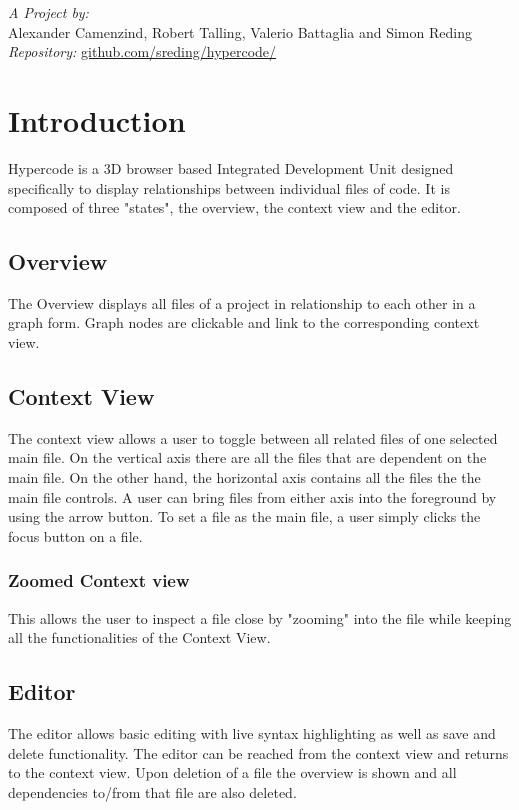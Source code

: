 \documentclass[a4paper]{article}
\author{Client: \realauthor \\
Universit\`a della Svizzera italiana - \coursename}
\title{\assingmentnr}
\begin{document}
\maketitle{\raggedleft}
\emph{A Project by:}\\
Alexander Camenzind, Robert Talling, Valerio Battaglia and Simon Reding\\

\emph{Repository:} \href{https://github.com/sreding/hypercode/}{github.com/sreding/hypercode/}

\section{Introduction}
Hypercode is a 3D browser based Integrated Development Unit designed specifically to display relationships between individual files of code. It is composed of three "states", the overview, the context view and the editor.
\subsection{Overview}
The Overview displays all files of a project in relationship to each other in a graph form. Graph nodes are clickable and link to the corresponding context view.
\subsection{Context View}
The context view allows a user to toggle between all related files of one selected main file. On the vertical axis there are all the files that are dependent on the main file. On the other hand, the horizontal axis contains all the files the the main file controls. A user can bring files from either axis into the foreground by using the arrow button. To set a file as the main file, a user simply clicks the focus button on a file. 

\subsubsection{Zoomed Context view}
This allows the user to inspect a file close by "zooming" into the file while keeping all the functionalities of the Context View.

\subsection{Editor}
The editor allows basic editing with live syntax highlighting as well as save and delete functionality. The editor can be reached from the context view and returns to the context view. Upon deletion of a file the overview is shown and all dependencies to/from that file are also deleted.
\end{document}
